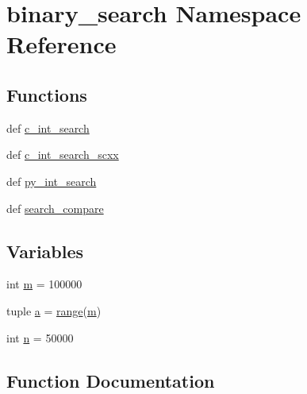 \hypertarget{namespacebinary__search}{}\section{binary\+\_\+search Namespace Reference}
\label{namespacebinary__search}
\subsection*{Functions}
\begin{DoxyCompactItemize}
\item 
def \hyperlink{namespacebinary__search_af69dc0a21b5e26260d90a6926fb4708f}{c\+\_\+int\+\_\+search}
\item 
def \hyperlink{namespacebinary__search_a28d260eed34dacb6e907a0c21cf5c3cc}{c\+\_\+int\+\_\+search\+\_\+scxx}
\item 
def \hyperlink{namespacebinary__search_ae61a04589b5dad327f7c198470a09869}{py\+\_\+int\+\_\+search}
\item 
def \hyperlink{namespacebinary__search_a58163ba6db41b425502e3e58786c03eb}{search\+\_\+compare}
\end{DoxyCompactItemize}
\subsection*{Variables}
\begin{DoxyCompactItemize}
\item 
int \hyperlink{namespacebinary__search_a7bb78375640ca71d5b216024836bec58}{m} = 100000
\item 
tuple \hyperlink{namespacebinary__search_a72dcca0e8a069868e3a0205d0c8b8a41}{a} = \hyperlink{numinquire_8h_a35e47346e37a09731e9c2d704288937d}{range}(\hyperlink{namespacebinary__search_a7bb78375640ca71d5b216024836bec58}{m})
\item 
int \hyperlink{namespacebinary__search_a5ea28a4c88f78431abe127859b9d600a}{n} = 50000
\end{DoxyCompactItemize}


\subsection{Function Documentation}
\hypertarget{namespacebinary__search_af69dc0a21b5e26260d90a6926fb4708f}{}
